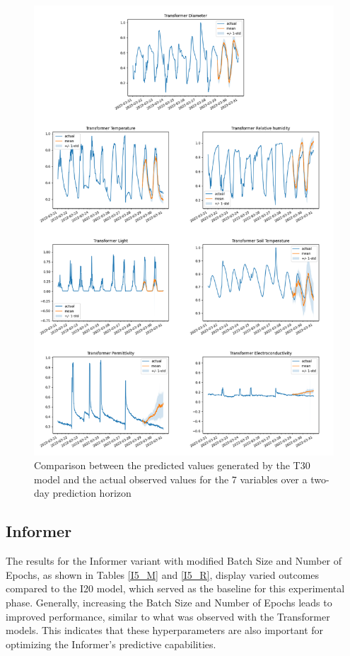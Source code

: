 \begin{figure}[htbp]
    \centering
    \includegraphics[width=15 cm]{6_ChapterResults/figuras/T30.png}
    \caption{Comparison between the predicted values generated by the T30 model and the actual observed values for the 7 variables over a two-day prediction horizon}
    \label{T30}
\end{figure}

\subsection{Informer}
The results for the Informer variant with modified Batch Size and Number of Epochs, as shown in Tables \ref{I5_M} and \ref{I5_R}, display varied outcomes compared to the I20 model, which served as the baseline for this experimental phase. Generally, increasing the Batch Size and Number of Epochs leads to improved performance, similar to what was observed with the Transformer models. This indicates that these hyperparameters are also important for optimizing the Informer's predictive capabilities.


